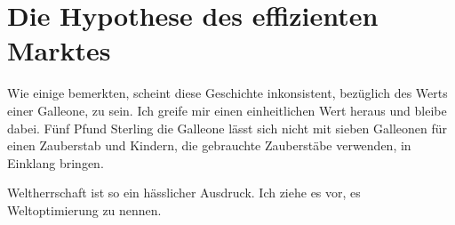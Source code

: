 \chapter{Die Hypothese des effizienten Marktes}

\begin{chapterOpeningAuthorNote}
%
Wie einige bemerkten, scheint diese Geschichte inkonsistent, bezüglich des Werts einer Galleone, zu sein. Ich greife mir einen einheitlichen Wert heraus und bleibe dabei. Fünf Pfund Sterling die Galleone lässt sich nicht mit sieben Galleonen für einen Zauberstab und Kindern, die gebrauchte Zauberstäbe verwenden, in Einklang bringen.
\end{chapterOpeningAuthorNote}
\begin{chapterOpeningQuote}
Weltherrschaft ist so ein hässlicher Ausdruck. Ich ziehe es vor, es Weltoptimierung zu nennen.%
\end{chapterOpeningQuote}


